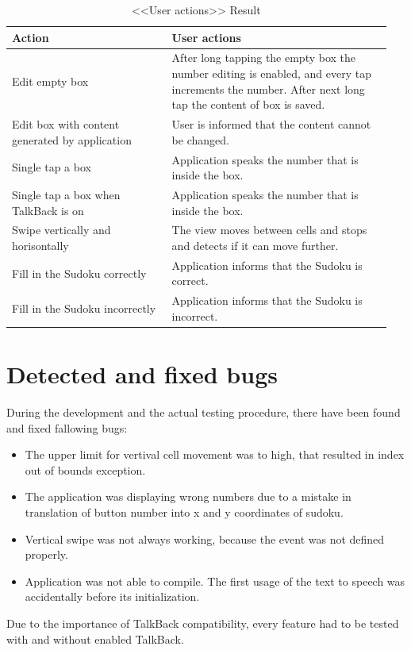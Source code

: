 \documentclass[a4paper,twoside,12pt]{book}
\newcommand\tabularhead[2]{
\begin{table}%
  \caption{<<#1>> #2}
  \begin{tabular}{|p{0.4\linewidth}|p{0.55\linewidth}|}
    \hline
    \textbf{Action} & \textbf{#1} \\
    \hline}
\newcommand\addrow[2]{#1 &#2\\ \hline}
\newcommand\addmulrow[2]{ \begin{minipage}[t][][t]{2.5cm}#1\end{minipage}%
     &\begin{minipage}[t][][t]{8cm}
      \begin{enumerate} #2   \end{enumerate}
      \end{minipage}\\ }
\newenvironment{usecase}{\tabularhead}
{\hline\end{tabular}\end{table}}
\begin{document}
\begin{usecase}{User actions}{Result}
	\label{usecase:Table}
    \addrow{Edit empty box}{After long tapping the empty box the number editing is enabled, and every tap increments the number. After next long tap the content of box is saved.}

    \addrow{Edit box with content generated by application}{User is informed that the content cannot be changed.}

	\addrow{Single tap a box}{Application speaks the number that is inside the box.}
	\addrow{Single tap a box when TalkBack is on}{Application speaks the number that is inside the box.}
	\addrow{Swipe vertically and horisontally}{The view moves between cells and stops and detects if it can move further.}
	\addrow{Fill in the Sudoku correctly}{Application informs that the Sudoku is correct.}
	\addrow{Fill in the Sudoku incorrectly}{Application informs that the Sudoku is incorrect.}
	
\end{usecase}

\section{Detected and fixed bugs}

\par During the development and the actual testing procedure, there have been found and fixed fallowing bugs:
\begin{itemize}
	\item The upper limit for vertival cell movement was to high, that resulted in index out of bounds exception.
	\item The application was displaying wrong numbers due to a mistake in translation of button number into x and y coordinates of sudoku.
	\item Vertical swipe was not always working, because the event was not defined properly.
	\item Application was not able to compile. The first usage of the text to speech was accidentally before its initialization.
\end{itemize}

\par Due to the importance of TalkBack compatibility, every feature had to be tested with and without enabled TalkBack.
\end{document}
